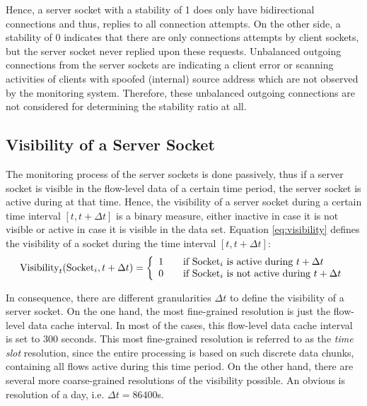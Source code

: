 Hence, a \gls{server socket} with a stability of 1 does only have bidirectional connections and thus, replies to all connection attempts. 
On the other side, a stability of 0 indicates that there are only connections attempts by client sockets, but the \gls{server socket} never replied upon these requests. 
Unbalanced outgoing connections from the \glspl{server socket} are indicating a client error or scanning activities of clients with spoofed (internal) source address which are not observed by the monitoring system. 
Therefore, these unbalanced outgoing connections are not considered for determining the stability ratio at all.

\subsection{Visibility of a Server Socket\label{subsection:visibility}}

The monitoring process of the \glspl{server socket} is done passively, thus if a \gls{server socket} is visible in the flow-level data of a certain time period, the \gls{server socket} is active during at that time. Hence, the visibility of a \gls{server socket} during a certain time interval $[t,t+\Delta{t}]$ is a binary measure, either inactive in case it is not visible or active in case it is visible in the data set. Equation \ref{eq:visibility} defines the visibility of a socket during the time interval $[t,t+\Delta{t}]$:
\begin{equation}
	\text{Visibility}_t(\text{Socket}_i,t+\Delta{t}) = \left\{
	\begin{array}{l l}
		1 & \quad \text{if $\text{Socket}_i$ is active during $t+\Delta{t}$}\\
		0 & \quad \text{if $\text{Socket}_i$ is not active during $t+\Delta{t}$}\\
	\end{array}
	\right.
	\label{eq:visibility}
\end{equation}

In consequence, there are different granularities $\Delta{t}$ to define the visibility of a \gls{server socket}. On the one hand, the most fine-grained resolution is just the flow-level data cache interval. In most of the cases, this flow-level data cache interval is set to 300 seconds. This most fine-grained resolution is referred to as the \emph{time slot} resolution, since the entire processing is based on such discrete data chunks, containing all flows active during this time period. 
On the other hand, there are several more coarse-grained resolutions of the visibility possible. An obvious is resolution of a day, i.e. $\Delta{t} = 86400$s.

